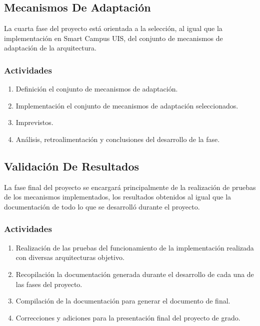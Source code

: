 \documentclass[12pt]{article}
\begin{document}
    \subsection{Mecanismos De Adaptación}
    
    La cuarta fase del proyecto está orientada a la selección, al igual que la implementación en Smart Campus UIS, del conjunto de mecanismos de adaptación de la arquitectura. 

    \subsubsection{Actividades}

   \begin{enumerate}[label=\thesubsection.\arabic*., wide, labelindent=2em, leftmargin=5em]
        \item Definición el conjunto de mecanismos de adaptación.
        \item Implementación el conjunto de mecanismos de adaptación seleccionados.
        \item Imprevistos.
        \item Análisis, retroalimentación y conclusiones del desarrollo de la fase. 
    \end{enumerate}  
    
    \subsection{Validación De Resultados}
    
    La fase final del proyecto se encargará principalmente de la realización de pruebas de los mecanismos implementados, los resultados obtenidos al igual que la documentación de todo lo que se desarrolló durante el proyecto.
    
    \subsubsection*{Actividades}
    
   \begin{enumerate}[label=\thesubsection.\arabic*., wide, labelindent=2em, leftmargin=5em]
        \item Realización de las pruebas del funcionamiento de la implementación realizada con diversas arquitecturas objetivo.
        \item Recopilación la documentación generada durante el desarrollo de cada una de las fases del proyecto.
        \item Compilación de la documentación para generar el documento de final.
        \item Correcciones y adiciones para la presentación final del proyecto de grado.
    \end{enumerate}  
\end{document}
